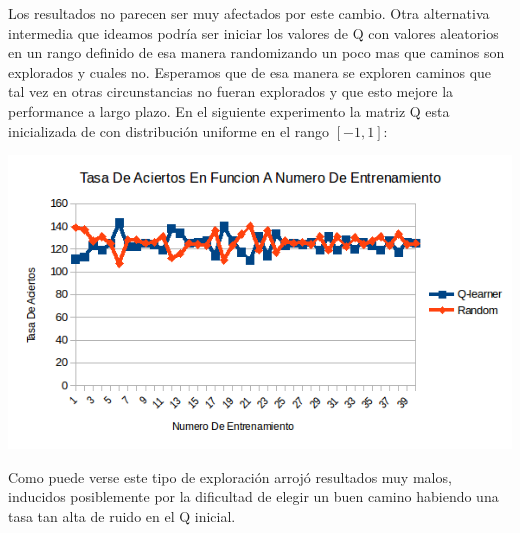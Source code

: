 Los resultados no parecen ser muy afectados por este cambio. Otra alternativa intermedia que ideamos podría ser iniciar los valores de Q con valores aleatorios en un rango definido de esa manera randomizando un poco mas que caminos son explorados y cuales no. Esperamos que de esa manera se exploren caminos que tal vez en otras circunstancias no fueran explorados y que esto mejore la performance a largo plazo. En el siguiente experimento la matriz Q esta inicializada de con distribución uniforme en el rango $[-1,1]$:

\includegraphics[scale=0.5]{testing/variarq2.png}

Como puede verse este tipo de exploración arrojó resultados muy malos, inducidos posiblemente por la dificultad de elegir un buen camino habiendo una tasa tan alta de ruido en el Q inicial.